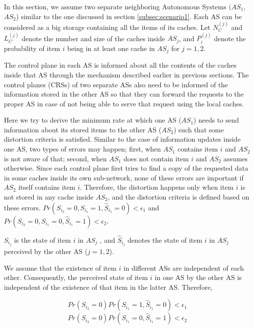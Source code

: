 \documentclass[conference]{IEEEtran}
\theoremstyle{plain}
\theoremstyle{remark}
\begin{document}
In this section, we assume two separate neighboring Autonomous Systems $(AS_1$, $AS_2$) similar to the one discussed in section \ref{subsec:scenario1}. Each AS can be considered as a big storage containing all the items of its caches. Let $N^{(j)}_C$ and $L^{(j)}_C$ denote the number and size of the caches inside $AS_j$, and $P^{(j)}_i$ denote the probability of item $i$ being in at least one cache in $AS_j$ for $j=1,2$.


The control plane in each AS is informed about all the contents of the caches inside that AS through the mechanism described earlier in previous sections. The control planes (CRSs) of two separate ASs also need to be informed of the information stored in the other AS so that they can forward the requests to the proper AS in case of not being able to serve that request using the local caches.

Here we try to derive the minimum rate at which one AS ($AS_1$) needs to send information about its stored items to the other AS ($AS_2$) such that some distortion criteria is satisfied. Similar to the case of information updates inside one AS, two types of errors may happen; first, when $AS_1$ contains item $i$ and $AS_2$ is not aware of that; second, when $AS_1$ does not contain item $i$ and $AS_2$ assumes otherwise. Since each control plane first tries to find a copy of the requested data in some caches inside its own sub-network, none of these errors are  important if $AS_2$ itself contains item $i$. Therefore, the distortion happens only when item $i$ is not stored in any cache inside $AS_2$, and the distortion criteria is defined based on these errors.
$Pr(S_{i_2}=0, S_{i_1}=1, \hat{S}_{i_1}=0)<\epsilon_1$ and $Pr(S_{i_2}=0, S_{i_1}=0, \hat{S}_{i_1}=1)<\epsilon_2$.

$S_{i_j}$ is the state of item $i$ in $AS_j$ , and $\hat{S}_{i_j}$ denotes the state of item $i$ in $AS_j$ perceived by the other AS ($j=1,2$).

We assume that the existence of item $i$ in different ASs are independent of each other. Consequently, the perceived state of item $i$ in one AS by the other AS is independent of the existence of that item in the latter AS. Therefore,

\begin{equation}
Pr(S_{i_2}=0)Pr(S_{i_1}=1, \hat{S}_{i_1}=0)<\epsilon_1 \nonumber
\end{equation}
\begin{equation}
Pr(S_{i_2}=0)Pr(S_{i_1}=0, \hat{S}_{i_1}=1)<\epsilon_2
\end{equation}
\end{document}
